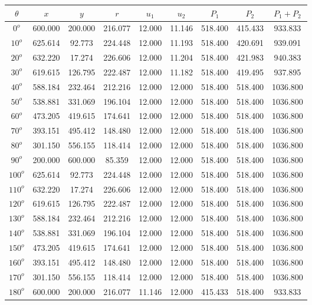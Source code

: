     \begin{table}[H]
        \centering
        \begin{tabular}{|c|c|c|c|c|c|c|c|c|} \hline
    $\theta$ &$x$ &$y$ &$r$ &$u_1$ &$u_2$ &$P_1$ &$P_2$ &$P_1+P_2$ \\ \hline
$0^o$	&600.000	&200.000	&216.077	&12.000	&11.146	&518.400	&415.433	&933.833 \\ \hline
$10^o$	&625.614	&92.773	&224.448	&12.000	&11.193	&518.400	&420.691	&939.091 \\ \hline
$20^o$	&632.220	&17.274	&226.606	&12.000	&11.204	&518.400	&421.983	&940.383 \\ \hline
$30^o$	&619.615	&126.795	&222.487	&12.000	&11.182	&518.400	&419.495	&937.895 \\ \hline
$40^o$	&588.184	&232.464	&212.216	&12.000	&12.000	&518.400	&518.400	&1036.800 \\ \hline
$50^o$	&538.881	&331.069	&196.104	&12.000	&12.000	&518.400	&518.400	&1036.800 \\ \hline
$60^o$	&473.205	&419.615	&174.641	&12.000	&12.000	&518.400	&518.400	&1036.800 \\ \hline
$70^o$	&393.151	&495.412	&148.480	&12.000	&12.000	&518.400	&518.400	&1036.800 \\ \hline
$80^o$	&301.150	&556.155	&118.414	&12.000	&12.000	&518.400	&518.400	&1036.800 \\ \hline
$90^o$	&200.000	&600.000	&85.359	&12.000	&12.000	&518.400	&518.400	&1036.800 \\ \hline
$100^o$	&625.614	&92.773	&224.448	&12.000	&12.000	&518.400	&518.400	&1036.800 \\ \hline
$110^o$	&632.220	&17.274	&226.606	&12.000	&12.000	&518.400	&518.400	&1036.800 \\ \hline
$120^o$	&619.615	&126.795	&222.487	&12.000	&12.000	&518.400	&518.400	&1036.800 \\ \hline
$130^o$	&588.184	&232.464	&212.216	&12.000	&12.000	&518.400	&518.400	&1036.800 \\ \hline
$140^o$	&538.881	&331.069	&196.104	&12.000	&12.000	&518.400	&518.400	&1036.800 \\ \hline
$150^o$	&473.205	&419.615	&174.641	&12.000	&12.000	&518.400	&518.400	&1036.800 \\ \hline
$160^o$	&393.151	&495.412	&148.480	&12.000	&12.000	&518.400	&518.400	&1036.800 \\ \hline
$170^o$	&301.150	&556.155	&118.414	&12.000	&12.000	&518.400	&518.400	&1036.800 \\ \hline
$180^o$	&600.000	&200.000	&216.077	&11.146	&12.000	&415.433	&518.400	&933.833 \\ \hline

\end{tabular}
\end{table}

